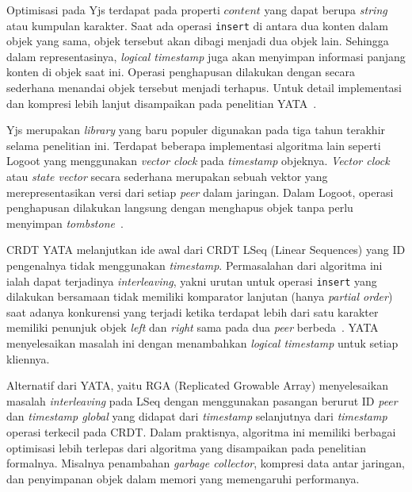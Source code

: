 Optimisasi pada Yjs terdapat pada properti $content$ yang dapat berupa \textit{string} atau kumpulan karakter. Saat ada operasi \texttt{insert} di antara dua konten dalam objek yang sama, objek tersebut akan dibagi menjadi dua objek lain. Sehingga dalam representasinya, \textit{logical timestamp} juga akan menyimpan informasi panjang konten di objek saat ini. Operasi penghapusan dilakukan dengan secara sederhana menandai objek tersebut menjadi terhapus. Untuk detail implementasi dan kompresi lebih lanjut disampaikan pada penelitian YATA~\citep{Nicolaescu2016yjs}.

Yjs merupakan \textit{library} yang baru populer digunakan pada tiga tahun terakhir selama penelitian ini. Terdapat beberapa implementasi algoritma lain seperti Logoot yang menggunakan \textit{vector clock} pada \textit{timestamp} objeknya. \textit{Vector clock} atau \textit{state vector} secara sederhana merupakan sebuah vektor yang merepresentasikan versi dari setiap \textit{peer} dalam jaringan. Dalam Logoot, operasi penghapusan dilakukan langsung dengan menghapus objek tanpa perlu menyimpan \textit{tombstone}~\citep{weiss2009logoot}.

CRDT YATA melanjutkan ide awal dari CRDT LSeq (Linear Sequences) yang ID pengenalnya tidak menggunakan \textit{timestamp}. Permasalahan dari algoritma ini ialah dapat terjadinya \textit{interleaving}, yakni urutan untuk operasi \texttt{insert} yang dilakukan bersamaan tidak memiliki komparator lanjutan (hanya \textit{partial order}) saat adanya konkurensi yang terjadi ketika terdapat lebih dari satu karakter memiliki penunjuk objek \textit{left} dan \textit{right} sama pada dua \textit{peer} berbeda~\citep{kleppmann2019interleaving, nedelec2013lseq}. YATA menyelesaikan masalah ini dengan menambahkan \textit{logical timestamp} untuk setiap kliennya.

Alternatif dari YATA, yaitu RGA (Replicated Growable Array) menyelesaikan masalah \textit{interleaving} pada LSeq dengan menggunakan pasangan berurut ID \textit{peer} dan \textit{timestamp global} yang didapat dari \textit{timestamp} selanjutnya dari \textit{timestamp} operasi terkecil pada CRDT. Dalam praktisnya, algoritma ini memiliki berbagai optimisasi lebih terlepas dari algoritma yang disampaikan pada penelitian formalnya. Misalnya penambahan \textit{garbage collector}, kompresi data antar jaringan, dan penyimpanan objek dalam memori yang memengaruhi performanya.